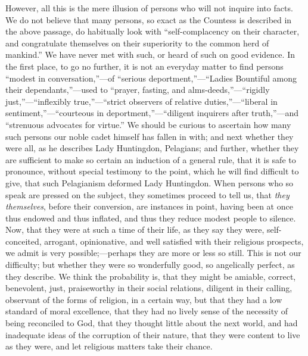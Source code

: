 However, all this is the mere illusion of persons
who will not inquire into facts. We do not believe that many
persons, so exact as the Countess is described in the above passage,
do habitually look with ``self-complacency on their character, and
congratulate themselves on their superiority to the common herd of
mankind.'' We have never met with such, or heard of such on good
evidence. In the first place, to go no further, it is not an everyday
matter to find persons ``modest in conversation,''—of ``serious
deportment,''—``Ladies Bountiful among their dependants,''—used to ``prayer,
fasting, and alms-deeds,''—``rigidly just,''—``inflexibly true,''—``strict
observers of relative duties,''—``liberal in sentiment,''—``courteous
in deportment,''—``diligent inquirers after truth,''—and ``strenuous
advocates for virtue.'' We should be curious to ascertain how many such
persons our noble cadet himself has fallen in with; and next whether
they were all, as he describes Lady Huntingdon, Pelagians; and
further, whether they are sufficient to make so certain an induction
of a general rule, that it is safe to pronounce, without special
testimony to the point, which he will find difficult to give, that
such Pelagianism deformed Lady Huntingdon. When persons who so speak
are pressed on the subject, they sometimes proceed to tell us, that \emph{they
themselves}, before their conversion, are instances in point,
having been at once thus endowed and thus inflated, and thus they
reduce modest people to silence. Now, that they were at such a time of
their life, as they say they were, self-conceited, arrogant,
opinionative, and well satisfied with their religious prospects, we
admit is very possible;—perhaps they are more or less so still. This
is not our difficulty; but whether they were so wonderfully good, so
angelically perfect, as they describe. We think the probability is,
that they might be amiable, correct, benevolent, just, praiseworthy in their social relations, diligent in their calling,
observant of the forms of religion, in a certain way, but that they
had a low standard of moral excellence, that they had no lively sense
of the necessity of being reconciled to God, that they thought little
about the next world, and had inadequate ideas of the corruption of
their nature, that they were content to live as they were, and let
religious matters take their chance.

